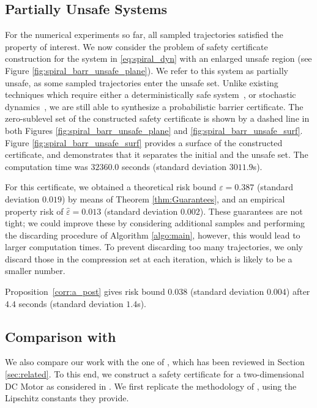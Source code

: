 \subsection{Partially Unsafe Systems}
For the numerical experiments so far, all sampled trajectories satisfied the property of interest.
We now consider the problem of safety certificate construction for the system in \eqref{eq:spiral_dyn} with an enlarged unsafe region (see Figure \ref{fig:spiral_barr_unsafe_plane}). We refer to this system as partially unsafe, as some sampled trajectories enter the unsafe set. Unlike existing techniques which require either a deterministically safe system~\cite{DBLP:conf/hybrid/EdwardsPA24}, or stochastic dynamics~\cite{DBLP:conf/cdc/PrajnaJP04}, we are still able to synthesize a probabilistic barrier certificate.  
The zero-sublevel set of the constructed safety certificate is shown by a dashed line in both Figures \ref{fig:spiral_barr_unsafe_plane} and \ref{fig:spiral_barr_unsafe_surf}. Figure \ref{fig:spiral_barr_unsafe_surf} provides a surface of the constructed certificate, and demonstrates that it separates the initial and the unsafe set. The computation time was $32360.0$ seconds (standard deviation $3011.9$s). 

For this certificate, we obtained a theoretical risk bound $\varepsilon = 0.387$ (standard deviation $0.019$) by means of Theorem \ref{thm:Guarantees}, and an empirical property risk of $\hat{\varepsilon} = 0.013$ (standard deviation $0.002$). 
These guarantees are not tight; we could improve these by considering additional samples and performing the discarding procedure of Algorithm \ref{algo:main}, however, this would lead to larger computation times.
To prevent discarding too many trajectories, we only discard those in the compression set at each iteration, which is likely to be a smaller number.

Proposition~\ref{corr:a_post} gives risk bound $0.038$ (standard deviation $0.004$) after $4.4$ seconds (standard deviation $1.4$s).

\subsection{Comparison with \cite{DBLP:journals/tac/NejatiLJSZ23}}

We also compare our work with the one of \cite{DBLP:journals/tac/NejatiLJSZ23}, which has been reviewed in Section \ref{sec:related}. To this end, we construct a safety certificate for a two-dimensional DC Motor as considered in \cite{DBLP:journals/tac/NejatiLJSZ23}. 
We first replicate the methodology of \cite{DBLP:journals/tac/NejatiLJSZ23}, using the Lipschitz constants they provide.

